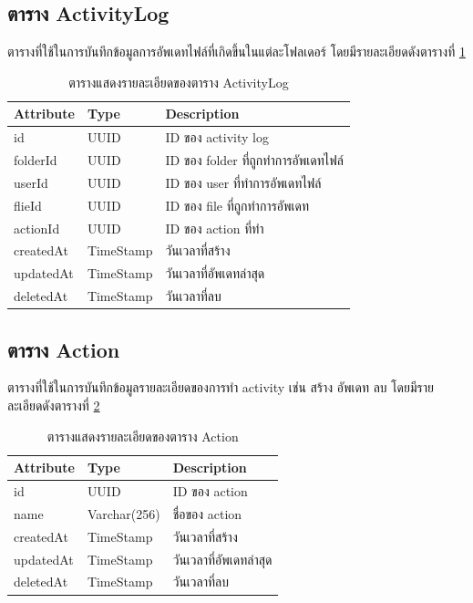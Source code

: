 \documentclass[12pt,oneside,openright,a4paper]{cpe-thai-project}
\begin{document}
\subsection{ตาราง ActivityLog}
ตารางที่ใช้ในการบันทึกข้อมูลการอัพเดทไฟล์ที่เกิดขึ้นในแต่ละโฟลเดอร์ โดยมีรายละเอียดดังตารางที่ \ref{tbl:dbActivityLog}
\begin{table}[!ht]
    \centering
    \begin{tabular}{|p{4cm}|p{2cm}|p{6cm}|}
    \hline
    \textbf{Attribute} & \textbf{Type} & \textbf{Description}   \\ \hline
    id        & UUID      & ID ของ activity log                 \\ \hline
    folderId  & UUID      & ID ของ folder ที่ถูกทำการอัพเดทไฟล์ \\ \hline
    userId    & UUID      & ID ของ user ที่ทำการอัพเดทไฟล์      \\ \hline
    flieId    & UUID      & ID ของ file ที่ถูกทำการอัพเดท       \\ \hline
    actionId  & UUID      & ID ของ action ที่ทำ                 \\ \hline
    createdAt & TimeStamp & วันเวลาที่สร้าง                     \\ \hline
    updatedAt & TimeStamp & วันเวลาที่อัพเดทล่าสุด              \\ \hline
    deletedAt & TimeStamp & วันเวลาที่ลบ                      \\ \hline
    \end{tabular}
    \caption{\centering  ตารางแสดงรายละเอียดของตาราง ActivityLog} \label{tbl:dbActivityLog}
\end{table}
\clearpage
\newpage
\subsection{ตาราง Action}
ตารางที่ใช้ในการบันทึกข้อมูลรายละเอียดของการทำ activity เช่น สร้าง อัพเดท ลบ โดยมีรายละเอียดดังตารางที่ \ref{tbl:dbAction}
\begin{table}[!ht]
    \centering
    \begin{tabular}{|p{4cm}|p{2cm}|p{6cm}|}
    \hline
    \textbf{Attribute} & \textbf{Type} & \textbf{Description}   \\ \hline
    id        & UUID        & ID ของ action          \\ \hline
    name      & Varchar(256) & ชื่อของ action         \\ \hline
    createdAt & TimeStamp   & วันเวลาที่สร้าง        \\ \hline
    updatedAt & TimeStamp   & วันเวลาที่อัพเดทล่าสุด \\ \hline
    deletedAt & TimeStamp   & วันเวลาที่ลบ          \\ \hline    
    \end{tabular}
    \caption{\centering  ตารางแสดงรายละเอียดของตาราง Action} \label{tbl:dbAction}
\end{table}
\end{document}
